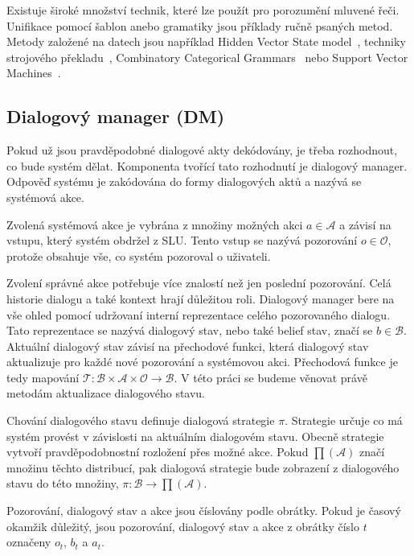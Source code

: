 Existuje široké množství technik, které lze použít pro porozumění mluvené řeči.
Unifikace pomocí šablon anebo gramatiky jsou příklady ručně psaných metod.
Metody založené na datech jsou například Hidden Vector State model~\cite{he2005semantic}, techniky strojového překladu~\cite{wong2007learning}, Combinatory Categorical Grammars~\cite{zettlemoyer2007online} nebo Support Vector Machines~\cite{mairesse2009spoken}.

\subsection{Dialogový manager (DM)}

Pokud už jsou pravděpodobné dialogové akty dekódovány, je třeba rozhodnout, co bude systém dělat.
Komponenta tvořící tato rozhodnutí je dialogový manager.
Odpověď systému je zakódována do formy dialogových aktů a nazývá se systémová akce.

Zvolená systémová akce je vybrána z množiny možných akci $a \in \mathcal{A}$ a závisí na vstupu, který systém obdržel z SLU.
Tento vstup se nazývá pozorování $o \in \mathcal{O}$, protože obsahuje vše, co systém pozoroval o uživateli.

Zvolení správné akce potřebuje více znalostí než jen poslední pozorování.
Celá historie dialogu a také kontext hrají důležitou roli.
Dialogový manager bere na vše ohled pomocí udržovaní interní reprezentace celého pozorovaného dialogu.
Tato reprezentace se nazývá dialogový stav, nebo také belief stav, značí se $b \in \mathcal{B}$.
Aktuální dialogový stav závisí na přechodové funkci, která dialogový stav aktualizuje pro každé nové pozorování a systémovou akci.
Přechodová funkce je tedy mapování $\mathcal{T} : \mathcal{B} \times \mathcal{A} \times \mathcal{O} \longrightarrow \mathcal{B}$.
V této práci se budeme věnovat právě metodám aktualizace dialogového stavu.

Chování dialogového stavu definuje dialogová strategie $\pi$.
Strategie určuje co má systém provést v závislosti na aktuálním dialogovém stavu.
Obecně strategie vytvoří pravděpodobnostní rozložení přes možné akce.
Pokud $\prod(\mathcal{A})$ značí množinu těchto distribucí, pak dialogová strategie bude zobrazení z dialogového stavu do této množiny, $\pi: \mathcal{B} \longrightarrow \prod(\mathcal{A})$.

Pozorování, dialogový stav a akce jsou číslovány podle obrátky.
Pokud je časový okamžik důležitý, jsou pozorování, dialogový stav a akce z obrátky číslo $t$ označeny $o_t$, $b_t$ a $a_t$.

